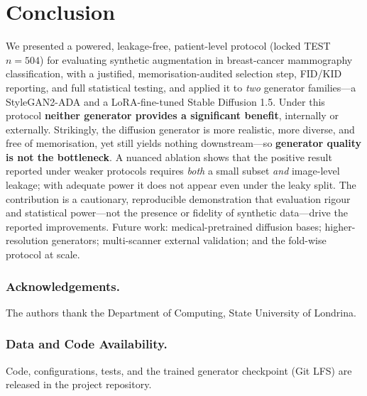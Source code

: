 \documentclass[runningheads]{llncs}
\begin{document}
\section{Conclusion}
We presented a powered, leakage-free, patient-level protocol (locked TEST
$n{=}504$) for evaluating synthetic augmentation in breast-cancer mammography
classification, with a justified, memorisation-audited selection step, FID/KID
reporting, and full statistical testing, and applied it to \emph{two} generator
families---a StyleGAN2-ADA and a LoRA-fine-tuned Stable Diffusion 1.5. Under this
protocol \textbf{neither generator provides a significant benefit}, internally or
externally. Strikingly, the diffusion generator is more realistic, more diverse,
and free of memorisation, yet still yields nothing downstream---so
\textbf{generator quality is not the bottleneck}. A nuanced ablation shows that
the positive result reported under weaker protocols requires \emph{both} a small
subset \emph{and} image-level leakage; with adequate power it does not appear even
under the leaky split. The contribution is a cautionary, reproducible
demonstration that evaluation rigour and statistical power---not the presence or
fidelity of synthetic data---drive the reported improvements. Future work:
medical-pretrained diffusion bases; higher-resolution generators; multi-scanner
external validation; and the fold-wise protocol at scale.

\subsubsection*{Acknowledgements.} The authors thank the Department of Computing,
State University of Londrina.

\subsubsection*{Data and Code Availability.} Code, configurations, tests, and the
trained generator checkpoint (Git LFS) are released in the project repository.



\end{document}
